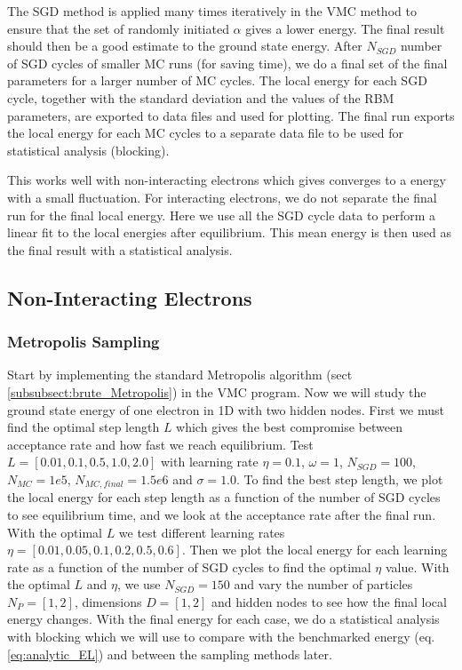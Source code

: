 \documentclass[12pt,a4paper,english]{article}
\begin{document}
The SGD method is applied many times iteratively in the VMC method to ensure that the set of randomly initiated $\alpha$ gives a lower energy. The final result should then be a good estimate to the ground state energy. After $N_{SGD}$ number of SGD cycles of smaller MC runs (for saving time), we do a final set of the final parameters for a larger number of MC cycles. The local energy for each SGD cycle, together with the standard deviation and the values of the RBM parameters, are exported to data files and used for plotting. The final run exports the local energy for each MC cycles to a separate data file to be used for statistical analysis (blocking). 

This works well with non-interacting electrons which gives converges to a energy with a small fluctuation. For interacting electrons, we do not separate the final run for the final local energy. Here we use all the SGD cycle data to perform a linear fit to the local energies after equilibrium. This mean energy is then used as the final result with a statistical analysis.

\subsection{Non-Interacting Electrons}
\label{subsect:Method_nonint}
\subsubsection{Metropolis Sampling}
\label{subsubsect:Method_Nonint_Metropolis}
Start by implementing the standard Metropolis algorithm (sect \ref{subsubsect:brute_Metropolis}) in the VMC program. Now we will study the ground state energy of one electron in 1D with two hidden nodes. First we must find the optimal step length $L$ which gives the best compromise between acceptance rate and how fast we reach equilibrium. Test $L=[0.01,0.1,0.5,1.0,2.0]$ with learning rate $\eta=0.1$, $\omega=1$, $N_{SGD}=100$, $N_{MC}=1e5$, $N_{MC,final}=1.5e6$ and $\sigma=1.0$. To find the best step length, we plot the local energy for each step length as a function of the number of SGD cycles to see equilibrium time, and we look at the acceptance rate after the final run. With the optimal $L$ we test different learning rates $\eta=[0.01,0.05,0.1,0.2,0.5,0.6]$. Then we plot the local energy for each learning rate as a function of the number of SGD cycles to find the optimal $\eta$ value. With the optimal $L$ and $\eta$, we use $N_{SGD}=150$ and vary the number of particles $N_P=[1,2]$, dimensions $D=[1,2]$ and hidden nodes to see how the final local energy changes. With the final energy for each case, we do a statistical analysis with blocking which we will use to compare with the benchmarked energy (eq. \ref{eq:analytic_EL}) and between the sampling methods later.
\end{document}
